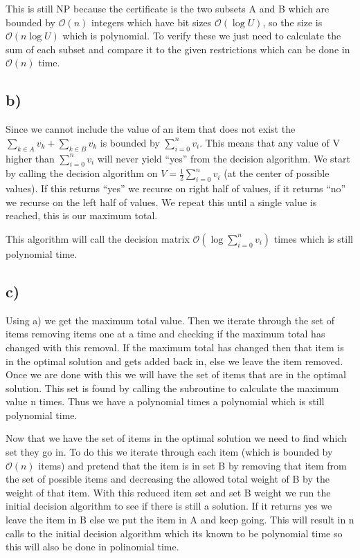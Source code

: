 \documentclass[12pt]{article}
\begin{document}
This is still NP because the certificate is the two subsets A and B which are bounded by $\mathcal{O}(n)$ integers which have bit sizes $\mathcal{O}(\log U)$, so the size is $\mathcal{O}(n\log U)$ which is polynomial. To verify these we just need to calculate the sum of each subset and compare it to the given restrictions which can be done in $\mathcal{O}(n)$ time.

\subsection*{b)}
Since we cannot include the value of an item that does not exist the $\sum_{k \in A}v_k + \sum_{k \in B}v_k$ is bounded by $\sum_{i=0}^n v_i$. This means that any value of V higher than  $\sum_{i=0}^n v_i$ will never yield ``yes'' from the decision algorithm. We start by calling the decision algorithm on $V = \frac{1}{2} \sum_{i=0}^n v_i$ (at the center of possible values). If this returns ``yes'' we recurse on right half of values, if it returns ``no'' we recurse on the left half of values. We repeat this until a single value is reached, this is our maximum total.

This algorithm will call the decision matrix $\mathcal{O}(\log  \sum_{i=0}^n v_i)$ times which is still polynomial time.

\subsection*{c)}
Using a) we get the maximum total value. Then we iterate through the set of items removing items one at a time and checking if the maximum total has changed with this removal. If the maximum total has changed then that item is in the optimal solution and gets added back in, else we leave the item removed. Once we are done with this we will have the set of items that are in the optimal solution. This set is found by calling the subroutine to calculate the maximum value n times. Thus we have a polynomial times a polynomial which is still polynomial time.

Now that we have the set of items in the optimal solution we need to find which set they go in. To do this we iterate through each item (which is bounded by $\mathcal{O}(n)$ items) and pretend that the item is in set B by removing that item from the set of possible items and decreasing the allowed total weight of B by the weight of that item. With this reduced item set and set B weight we run the initial decision algorithm to see if there is still a solution. If it returns yes we leave the item in B else we put the item in A and keep going. This will result in n calls to the initial decision algorithm which its known to be polynomial time so this will also be done in polinomial time.
\end{document}
